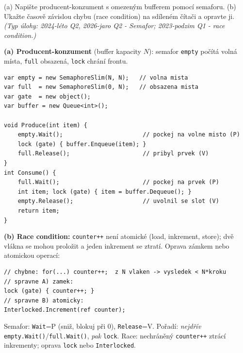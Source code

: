 \begin{zadani}
(a) Napište producent-konzument s omezeným bufferem pomocí semaforu. (b) Ukažte časově závislou chybu (race condition) na sdíleném čítači a opravte ji. \emph{(Typ úlohy: 2024-léto Q2, 2026-jaro Q2 - Semafor; 2023-podzim Q1 - race condition.)}
\end{zadani}

\begin{reseni}
\textbf{(a) Producent-konzument} (buffer kapacity $N$): semafor \texttt{empty} počítá volná místa, \texttt{full} obsazená, \texttt{lock} chrání frontu.
\begin{lstlisting}
var empty = new SemaphoreSlim(N, N);   // volna mista
var full  = new SemaphoreSlim(0, N);   // obsazena mista
var gate  = new object();
var buffer = new Queue<int>();

void Produce(int item) {
    empty.Wait();                       // pockej na volne misto (P)
    lock (gate) { buffer.Enqueue(item); }
    full.Release();                     // pribyl prvek (V)
}
int Consume() {
    full.Wait();                        // pockej na prvek (P)
    int item; lock (gate) { item = buffer.Dequeue(); }
    empty.Release();                    // uvolnil se slot (V)
    return item;
}
\end{lstlisting}

\textbf{(b) Race condition:} \texttt{counter++} není atomické (load, inkrement, store); dvě vlákna se mohou proložit a jeden inkrement se ztratí. Oprava zámkem nebo atomickou operací:
\begin{lstlisting}
// chybne: for(...) counter++;  z N vlaken -> vysledek < N*kroku
// spravne A) zamek:
lock (gate) { counter++; }
// spravne B) atomicky:
Interlocked.Increment(ref counter);
\end{lstlisting}
\end{reseni}

\begin{jadro}
Semafor: \texttt{Wait}=P (sniž, blokuj při 0), \texttt{Release}=V. Pořadí: \emph{nejdřív} \texttt{empty.Wait()}/\texttt{full.Wait()}, \emph{pak} \texttt{lock}. Race: nechráněný \texttt{counter++} ztrácí inkrementy; oprava \texttt{lock} nebo \texttt{Interlocked}.
\end{jadro}

